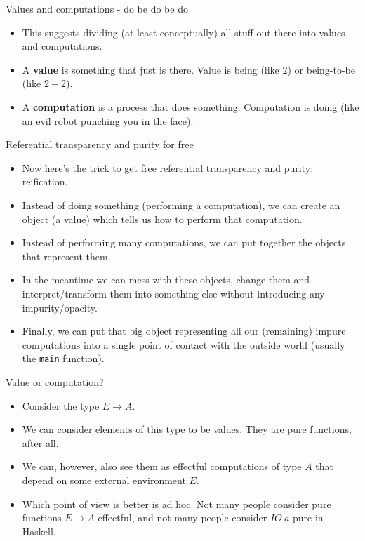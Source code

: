 \documentclass{beamer}
\begin{document}
\begin{frame}{Values and computations - do be do be do}
\begin{itemize}
	\item This suggests dividing (at least conceptually) all stuff out there into values and computations.
	\item A \textbf{value} is something that just is there. Value is being (like $2$) or being-to-be (like $2+2$).
	\item A \textbf{computation} is a process that does something. Computation is doing (like an evil robot punching you in the face).
\end{itemize}
\end{frame}

\begin{frame}{Referential transparency and purity for free}
\begin{itemize}
	\item Now here's the trick to get free referential transparency and purity: reification.
	\item Instead of doing something (performing a computation), we can create an object (a value) which tells us how to perform that computation.
	\item Instead of performing many computations, we can put together the objects that represent them.
	\item In the meantime we can mess with these objects, change them and interpret/transform them into something else without introducing any impurity/opacity.
	\item Finally, we can put that big object representing all our (remaining) impure computations into a single point of contact with the outside world (usually the \texttt{main} function).
\end{itemize}
\end{frame}

\begin{frame}{Value or computation?}
\begin{itemize}
	\item Consider the type $E \to A$.
	\item We can consider elements of this type to be values. They are pure functions, after all.
	\item We can, however, also see them as effectful computations of type $A$ that depend on some external environment $E$.
	\item Which point of view is better is ad hoc. Not many people consider pure functions $E \to A$ effectful, and not many people consider $IO\ a$ pure in Haskell.
\end{itemize}
\end{frame}
\end{document}
